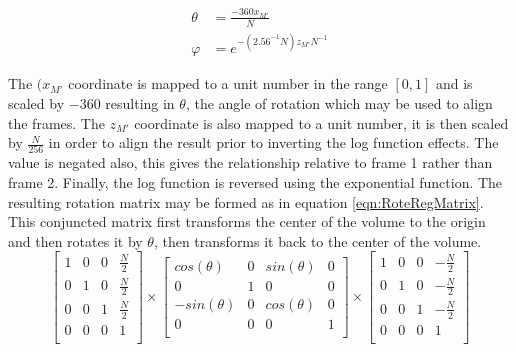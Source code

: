 \begin{equation} \label{eqn:ROTATIONSCALEFROMXM}
\begin{split}
\theta & = \frac{-360x_{M'}}{N}\\
\varphi & = e^{
-\left(
2.56^{-1}N
\right)z_{M'}N^{-1}
}
\end{split}
\end{equation}

The $(x_{M'}$ coordinate is mapped to a unit number in the range $[0,1]$ and is scaled by $-360$ resulting in $\theta$, the angle of rotation which may be used to align the frames. The $z_{M'}$ coordinate is also mapped to a unit number, it is then scaled by $\frac{N}{256}$ in order to align the result prior to inverting the log function effects. The value is negated also, this gives the relationship relative to frame 1 rather than frame 2. Finally, the log function is reversed using the exponential function. The resulting rotation matrix may be formed as in equation \ref{eqn:RoteRegMatrix}. This conjuncted matrix first transforms the center of the volume to the origin and then rotates it by $\theta$, then transforms it back to the center of the volume. \\

\begin{equation} \label{eqn:RoteRegMatrix}
\left[
\begin{array}{cccc}
1 & 0 & 0 & \frac{N}{2} \\
0 & 1 & 0 & \frac{N}{2} \\
0 & 0 & 1 & \frac{N}{2} \\
0 & 0 & 0 & 1 \\
\end{array}
\right] \times
\left[
\begin{array}{cccc}
cos(\theta) & 0 & sin(\theta) & 0 \\
0 & 1 & 0 & 0 \\
-sin(\theta) & 0 & cos(\theta) & 0 \\
0 & 0 & 0 & 1 \\
\end{array}
\right] \times
\left[
\begin{array}{cccc}
1 & 0 & 0 & -\frac{N}{2} \\
0 & 1 & 0 & -\frac{N}{2} \\
0 & 0 & 1 & -\frac{N}{2} \\
0 & 0 & 0 & 1 \\
\end{array}
\right]
\end{equation}

